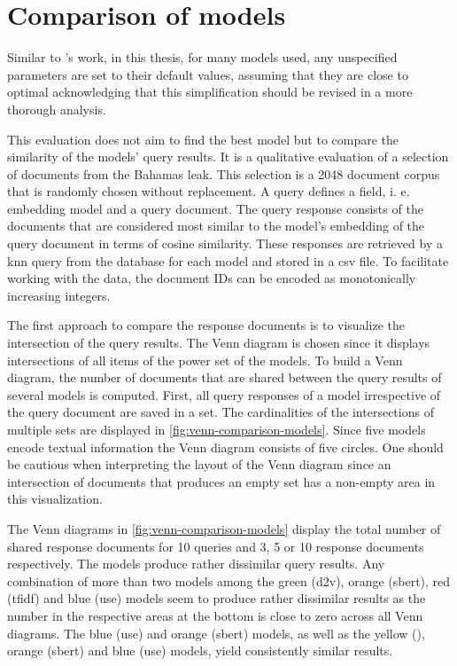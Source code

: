 \section{Comparison of models}\label{sec:evaluation-models}

Similar to \citeauthor{glove2014}'s work, in this thesis, for many models used, any unspecified parameters are set to their default values, 
assuming that they are close to optimal
acknowledging that this simplification should be revised in a more thorough analysis.

This evaluation does not aim to find the best model but to compare the similarity of the models' query results.
It is a qualitative evaluation of a selection of documents from the Bahamas leak.
This selection is a 2048 document corpus that is randomly chosen without replacement.
A query defines a field, i. e. embedding model and a query document.
The query response consists of the documents that are considered most similar to the model's embedding of the query document in terms of cosine similarity.
These responses are retrieved by a \ac{knn} query from the database for each model and stored in a \ac{csv} file.
To facilitate working with the data, the document IDs can be encoded as monotonically increasing integers.

The first approach to compare the response documents is to visualize the intersection of the query results.
The Venn diagram is chosen since it displays intersections of all items of the power set of the models.
To build a Venn diagram, the number of documents that are shared between the query results of several models is computed.
First, all query responses of a model irrespective of the query document are saved in a set.
The cardinalities of the intersections of multiple sets are displayed in \autoref{fig:venn-comparison-models}.
Since five models encode textual information the Venn diagram consists of five circles.
One should be cautious when interpreting the layout of the Venn diagram since 
an intersection of documents that produces an empty set has a non-empty area in this visualization.

The Venn diagrams in \autoref{fig:venn-comparison-models} display the total number of shared response documents for 10 queries 
and 3, 5 or 10 response documents respectively.
The models produce rather dissimilar query results.
Any combination of more than two models among the green (\ac{d2v}), orange (\ac{sbert}), red (\ac{tfidf}) and blue (\ac{use}) models 
seem to produce rather dissimilar results 
as the number in the respective areas at the bottom is close to zero across all Venn diagrams.
The blue (\ac{use}) and orange (\ac{sbert}) models, as well as the yellow (\infersent{}), orange (\ac{sbert}) and blue (\ac{use}) models, 
yield consistently similar results.

